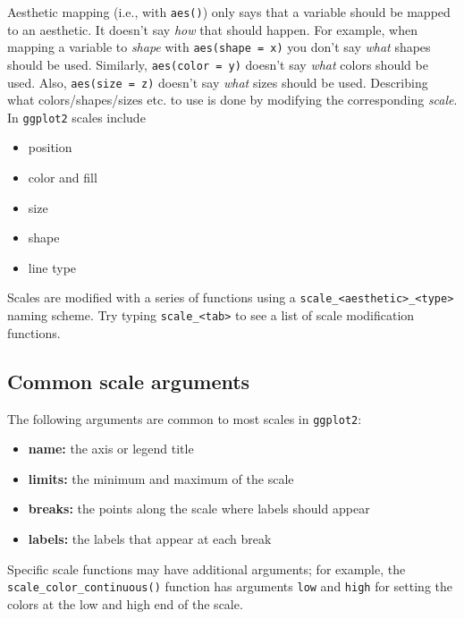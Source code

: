 \documentclass[]{book}
\providecommand{\tightlist}{%
  \setlength{\itemsep}{0pt}\setlength{\parskip}{0pt}}
\begin{document}
Aesthetic mapping (i.e., with \texttt{aes()}) only says that a variable should be mapped to an aesthetic. It doesn't say \emph{how} that should happen. For example, when mapping a variable to \emph{shape} with \texttt{aes(shape\ =\ x)} you don't say \emph{what} shapes should be used. Similarly, \texttt{aes(color\ =\ y)} doesn't say \emph{what} colors should be used. Also, \texttt{aes(size\ =\ z)} doesn't say \emph{what} sizes should be used. Describing what colors/shapes/sizes etc. to use is done by modifying the corresponding \emph{scale}. In \texttt{ggplot2} scales include

\begin{itemize}
\tightlist
\item
  position
\item
  color and fill
\item
  size
\item
  shape
\item
  line type
\end{itemize}

Scales are modified with a series of functions using a \texttt{scale\_\textless{}aesthetic\textgreater{}\_\textless{}type\textgreater{}} naming scheme. Try typing \texttt{scale\_\textless{}tab\textgreater{}} to see a list of scale modification functions.

\hypertarget{common-scale-arguments}{%
\subsection{Common scale arguments}\label{common-scale-arguments}}

The following arguments are common to most scales in \texttt{ggplot2}:

\begin{itemize}
\tightlist
\item
  \textbf{name:} the axis or legend title
\item
  \textbf{limits:} the minimum and maximum of the scale
\item
  \textbf{breaks:} the points along the scale where labels should appear
\item
  \textbf{labels:} the labels that appear at each break
\end{itemize}

Specific scale functions may have additional arguments; for example, the \texttt{scale\_color\_continuous()} function has arguments \texttt{low} and \texttt{high} for setting the colors at the low and high end of the scale.
\end{document}
